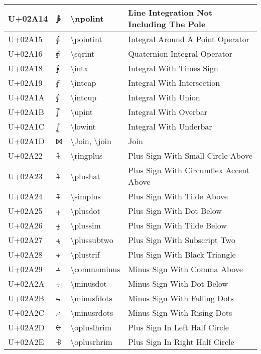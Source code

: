 \begin{table}[h]
\begin{tabulary}{\linewidth}{|L|L|L|L|}
U+02A14 & ⨔ & {\textbackslash}npolint & Line Integration Not Including The Pole \\
\hline
U+02A15 & ⨕ & {\textbackslash}pointint & Integral Around A Point Operator \\
\hline
U+02A16 & ⨖ & {\textbackslash}sqrint & Quaternion Integral Operator \\
\hline
U+02A18 & ⨘ & {\textbackslash}intx & Integral With Times Sign \\
\hline
U+02A19 & ⨙ & {\textbackslash}intcap & Integral With Intersection \\
\hline
U+02A1A & ⨚ & {\textbackslash}intcup & Integral With Union \\
\hline
U+02A1B & ⨛ & {\textbackslash}upint & Integral With Overbar \\
\hline
U+02A1C & ⨜ & {\textbackslash}lowint & Integral With Underbar \\
\hline
U+02A1D & ⨝ & {\textbackslash}Join, {\textbackslash}join & Join \\
\hline
U+02A22 & ⨢ & {\textbackslash}ringplus & Plus Sign With Small Circle Above \\
\hline
U+02A23 & ⨣ & {\textbackslash}plushat & Plus Sign With Circumflex Accent Above \\
\hline
U+02A24 & ⨤ & {\textbackslash}simplus & Plus Sign With Tilde Above \\
\hline
U+02A25 & ⨥ & {\textbackslash}plusdot & Plus Sign With Dot Below \\
\hline
U+02A26 & ⨦ & {\textbackslash}plussim & Plus Sign With Tilde Below \\
\hline
U+02A27 & ⨧ & {\textbackslash}plussubtwo & Plus Sign With Subscript Two \\
\hline
U+02A28 & ⨨ & {\textbackslash}plustrif & Plus Sign With Black Triangle \\
\hline
U+02A29 & ⨩ & {\textbackslash}commaminus & Minus Sign With Comma Above \\
\hline
U+02A2A & ⨪ & {\textbackslash}minusdot & Minus Sign With Dot Below \\
\hline
U+02A2B & ⨫ & {\textbackslash}minusfdots & Minus Sign With Falling Dots \\
\hline
U+02A2C & ⨬ & {\textbackslash}minusrdots & Minus Sign With Rising Dots \\
\hline
U+02A2D & ⨭ & {\textbackslash}opluslhrim & Plus Sign In Left Half Circle \\
\hline
U+02A2E & ⨮ & {\textbackslash}oplusrhrim & Plus Sign In Right Half Circle \\

\end{tabulary}
\end{table}
